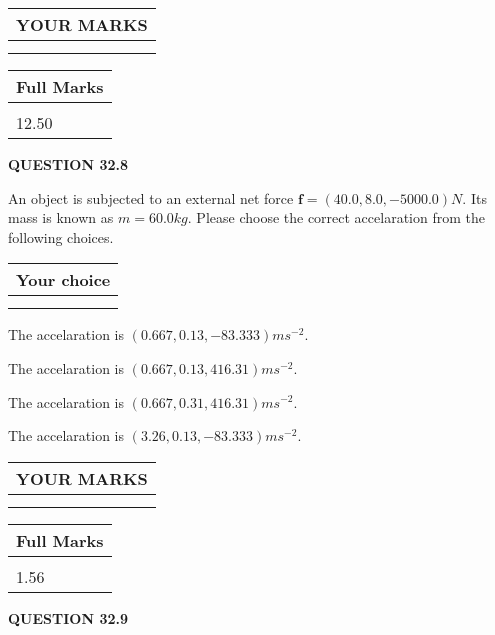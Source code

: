 \documentclass[12pt]{article}
\begin{document}
 

 
\vspace{0.3in}
  
\vspace{0.2in}
  
\noindent\begin{tabular}{|l|}
\hline
 YOUR MARKS  \\
\hline
 \\ 
 \\ 
\hline
\end{tabular}
\hspace{0.05in} \begin{tabular}{|l|}
\hline
 Full Marks  \\
\hline
 \\ 
12.50 \\
\hline
\end{tabular}
{\textbf{\Large{QUESTION
32.8 
}}}
  
  
 
An object is subjected to an external net force $\mathbf{f}=
(40.0 , 8.0 , -5000.0) N$.
Its mass is known as $m= %
60.0 kg$.
Please choose the correct accelaration from the following choices.
  
  
\noindent\hspace{3.0in} \begin{tabular}{|l|}
\hline
Your choice \\
\hline
 \\ 
 \\ 
\hline
\end{tabular}
  
  
 
 
  The accelaration is $  %
(
0.667,
0.13,
-83.333)
ms^{-2} $.
 
 
  The accelaration is $  %
(
0.667,
0.13,
416.31)
ms^{-2} $.
 
 
  The accelaration is $  %
(
0.667,
0.31,
416.31)
ms^{-2} $.
 
 
  The accelaration is $  %
(
3.26,
0.13,
-83.333)
ms^{-2} $.
 
 
 

 
 
\vspace{0.3in}
  
\vspace{0.2in}
  
\noindent\begin{tabular}{|l|}
\hline
 YOUR MARKS  \\
\hline
 \\ 
 \\ 
\hline
\end{tabular}
\hspace{0.05in} \begin{tabular}{|l|}
\hline
 Full Marks  \\
\hline
 \\ 
1.56 \\
\hline
\end{tabular}
{\textbf{\Large{QUESTION
32.9 
}}}
  
\end{document}
